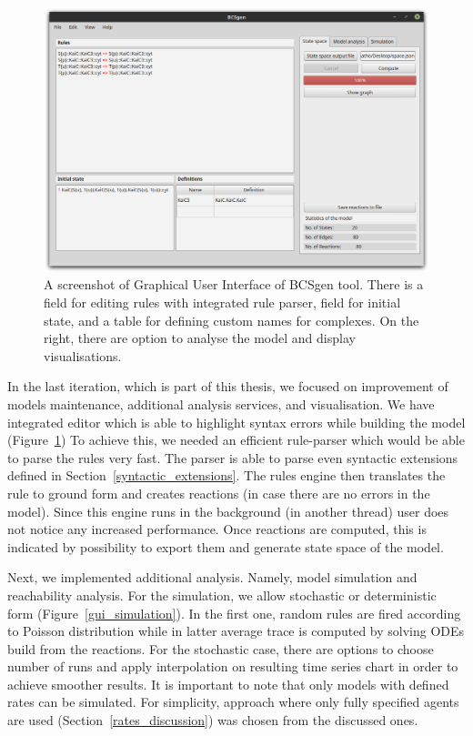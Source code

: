 \documentclass[12pt]{fithesis2}
\begin{document}
\begin{figure}[!h]
\begin{center}
\includegraphics[scale=0.33]{pics/BCSgen_gui}
\caption{A screenshot of Graphical User Interface of BCSgen tool. There is a field for editing rules with integrated rule parser, field for initial state, and a table for defining custom names for complexes. On the right, there are option to analyse the model and display visualisations.}\label{gui_example}
\end{center}
\end{figure}

In the last iteration, which is part of this thesis, we focused on improvement of models maintenance, additional analysis services, and visualisation. We have integrated editor which is able to highlight syntax errors while building the model (Figure~\ref{gui_example}) To achieve this, we needed an efficient rule-parser which would be able to parse the rules very fast. The parser is able to parse even syntactic extensions defined in Section~\ref{syntactic_extensions}. The rules engine then translates the rule to ground form and creates reactions (in case there are no errors in the model). Since this engine runs in the background (in another thread) user does not notice any increased performance. Once reactions are computed, this is indicated by possibility to export them and generate state space of the model.

Next, we implemented additional analysis. Namely, model simulation and reachability analysis. For the simulation, we allow stochastic or deterministic form (Figure~\ref{gui_simulation}). In the first one, random rules are fired according to Poisson distribution while in latter average trace is computed by solving ODEs build from the reactions. For the stochastic case, there are options to choose number of runs and apply interpolation on resulting time series chart in order to achieve smoother results. It is important to note that only models with defined rates can be simulated. For simplicity, approach where only fully specified agents are used (Section~\ref{rates_discussion}) was chosen from the discussed ones.
\end{document}
